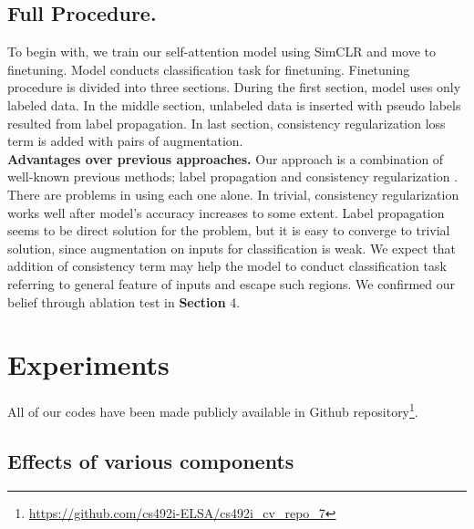 \documentclass[10pt,twocolumn,letterpaper]{article}
\begin{document}
	\subsection{Full Procedure.} To begin with, we train our self-attention model using SimCLR and move to finetuning. Model conducts classification task for finetuning. Finetuning procedure is divided into three sections. During the first section, model uses only labeled data. In the middle section, unlabeled data is inserted with pseudo labels resulted from label propagation. In last section, consistency regularization loss term is added with pairs of augmentation.\\
	\textbf{Advantages over previous approaches.} Our approach is a combination of well-known previous methods; label propagation \cite{Iscen2019} and consistency regularization \cite{Xie2020}. There are problems in using each one alone. In trivial, consistency regularization works well after model's accuracy increases to some extent. Label propagation seems to be direct solution for the problem, but it is easy to converge to trivial solution, since augmentation on inputs for classification is weak. We expect that addition of consistency term may help the model to conduct classification task referring to general feature of inputs and escape such regions. We confirmed our belief through ablation test in \textbf{Section} 4.
	
	\section{Experiments}
	All of our codes have been made publicly available in Github repository\footnote{\url{https://github.com/cs492i-ELSA/cs492i_cv_repo_7}}.
	
	\subsection{Effects of various components}
\end{document}
